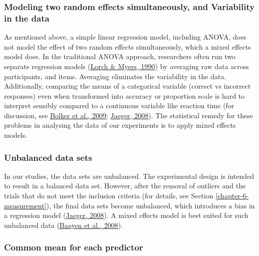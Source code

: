 \documentclass[a4paper, nobind]{templates/ociamthesis}
\begin{document}
\hypertarget{modeling-two-random-effects-simultaneously-and-variability-in-the-data}{%
\subsubsection{Modeling two random effects simultaneously, and Variability in the data}\label{modeling-two-random-effects-simultaneously-and-variability-in-the-data}}

As mentioned above, a simple linear regression model, including ANOVA, does not model the effect of two random effects simultaneously, which a mixed effects model does.
In the traditional ANOVA approach, researchers often run two separate regression models (\protect\hyperlink{ref-Lorch1990}{Lorch \& Myers, 1990}) by averaging raw data across participants, and items.
Averaging eliminates the variability in the data.
Additionally, comparing the means of a categorical variable (correct vs incorrect responses) even when transformed into accuracy or proportion scale is hard to interpret sensibly compared to a continuous variable like reaction time (for discussion, see \protect\hyperlink{ref-Bolker2009}{Bolker et al., 2009}; \protect\hyperlink{ref-Jaeger2008}{Jaeger, 2008}).
The statistical remedy for these problems in analysing the data of our experiments is to apply mixed effects models.

\hypertarget{unbalanced-data-sets}{%
\subsubsection{Unbalanced data sets}\label{unbalanced-data-sets}}

In our studies, the data sets are unbalanced.
The experimental design is intended to result in a balanced data set.
However, after the removal of outliers and the trials that do not meet the inclusion criteria (for details, see Section \ref{chapter-6-measurement}), the final data sets become unbalanced,
which introduces a bias in a regression model (\protect\hyperlink{ref-Jaeger2008}{Jaeger, 2008}).
A mixed effects model is best suited for such unbalanced data (\protect\hyperlink{ref-Baayen2008}{Baayen et al., 2008}).

\hypertarget{common-mean-for-each-predictor}{%
\subsubsection{Common mean for each predictor}\label{common-mean-for-each-predictor}}
\end{document}
